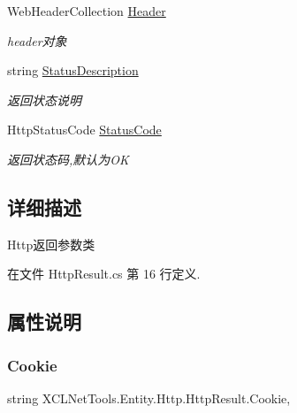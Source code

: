 \begin{DoxyCompactItemize}
Web\+Header\+Collection \hyperlink{class_x_c_l_net_tools_1_1_entity_1_1_http_1_1_http_result_af2f67a87b13cf52358900ff814f88f20}{Header}
\begin{DoxyCompactList}\small\item\em header对象 \end{DoxyCompactList}\item 
string \hyperlink{class_x_c_l_net_tools_1_1_entity_1_1_http_1_1_http_result_ae52de9f66b0248b366ee38cc9eae5659}{Status\+Description}
\begin{DoxyCompactList}\small\item\em 返回状态说明 \end{DoxyCompactList}\item 
Http\+Status\+Code \hyperlink{class_x_c_l_net_tools_1_1_entity_1_1_http_1_1_http_result_afa7d6f65074d0dc74bca65f6e7d79a79}{Status\+Code}
\begin{DoxyCompactList}\small\item\em 返回状态码,默认为\+OK \end{DoxyCompactList}\end{DoxyCompactItemize}


\subsection{详细描述}
Http返回参数类 



在文件 Http\+Result.\+cs 第 16 行定义.



\subsection{属性说明}
\mbox{\label{class_x_c_l_net_tools_1_1_entity_1_1_http_1_1_http_result_a08219bb78cf5eb91045b344c91e72fad}} 
\subsubsection{\texorpdfstring{Cookie}{Cookie}}
{\footnotesize\ttfamily string X\+C\+L\+Net\+Tools.\+Entity.\+Http.\+Http\+Result.\+Cookie\hspace{0.3cm}{\ttfamily [get]}, {\ttfamily [set]}}



